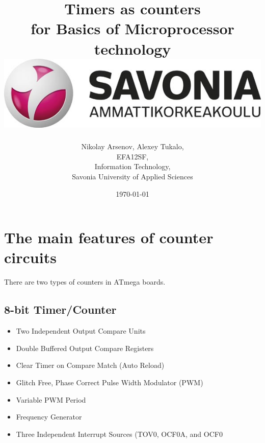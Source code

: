 \documentclass[english]{article}
\date{}
\begin{document}
\title{\vspace{2in}Timers as counters\\
\small for Basics of Microprocessor technology\\
\vspace{0.5in}\includegraphics{savonia.jpg}}

\nopagebreak
\maketitle


\vspace{3in}

\author{
\begin{flushright}
Nikolay Arsenov, Alexey Tukalo,\\
EFA12SF,\\
Information Technology,\\
Savonia University of Applied Sciences
\end{flushright}
}

\date{\today}
\thispagestyle{empty}

\newpage
\setcounter{page}{1}
\setcounter{tocdepth}{2}
\tableofcontents

\newpage


\section{The main features of counter circuits}
There are two types of counters in ATmega boards.
\subsection{8-bit Timer/Counter}
\begin{itemize}
\item Two Independent Output Compare Units
\item Double Buffered Output Compare Registers
\item Clear Timer on Compare Match (Auto Reload)
\item Glitch Free, Phase Correct Pulse Width Modulator (PWM)
\item Variable PWM Period
\item Frequency Generator
\item Three Independent Interrupt Sources (TOV0, OCF0A, and OCF0
\end{itemize}
\end{document}
